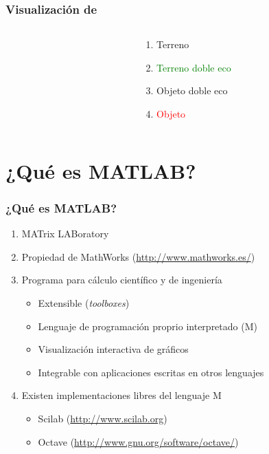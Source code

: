 \begin{frame}
 \frametitle{Visualización de \LARGE{}}
\begin{columns}
  \begin{column}{0.65\textwidth}
    \begin{center}
   \end{center}
  \end{column}
  \begin{column}{0.35\textwidth}
	\begin{enumerate}
	 \item \textcolor{yellow!95!black}{Terreno}
	 \item \textcolor{green}{Terreno doble eco}
	 \item \textcolor{blue!90!black}{Objeto doble eco}
	 \item \textcolor{red}{Objeto}
	\end{enumerate}
  \end{column}
\end{columns}
\end{frame}






\section{¿Qué es MATLAB?}
\begin{frame}[label=que_es]
    \frametitle{¿Qué es MATLAB?}
    \begin{enumerate}
        \item \alert{MAT}rix \alert{LAB}oratory
        \item Propiedad de MathWorks (\url{http://www.mathworks.es/})
        \item Programa para cálculo científico y de ingeniería
	\begin{itemize}
	 \item Extensible (\emph{toolboxes})
         \item Lenguaje de programación proprio interpretado (\alert{M})
         \item Visualización interactiva de gráficos
         \item Integrable con aplicaciones escritas en otros lenguajes
	\end{itemize}
        \item Existen implementaciones libres del lenguaje M
	\begin{itemize}
	 \item Scilab (\url{http://www.scilab.org})
	 \item Octave (\url{http://www.gnu.org/software/octave/})
	\end{itemize}
    \end{enumerate}
\end{frame}
